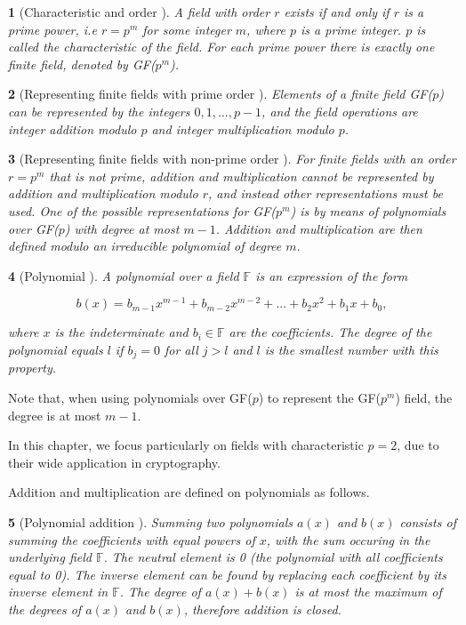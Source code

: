 \documentclass{report}
\newtheorem*{concept}{}{\bfseries}{\itshape}
\begin{document}
\begin{concept}[Characteristic and order \cite{DesignOfRijndael2002}]
A field with order $r$ exists if and only if $r$ is a prime power, i.e $r = p^m$ for some integer $m$, where $p$ is a prime integer. $p$ is called the \emph{characteristic} of the field. For each prime power there is exactly one finite field, denoted by GF($p^m$).
\end{concept}

\begin{concept}[Representing finite fields with prime order \cite{DesignOfRijndael2002}]
Elements of a finite field GF($p$) can be represented by the integers $0, 1, ..., p - 1$, and the field operations are integer addition modulo $p$ and integer multiplication modulo $p$.
\end{concept}

\begin{concept}[Representing finite fields with non-prime order \cite{DesignOfRijndael2002}]
For finite fields with an order $r = p^m$ that is not prime, addition and multiplication cannot be represented by addition and multiplication modulo $r$, and instead other representations must be used. One of the possible representations for GF($p^m$) is by means of \emph{polynomials over GF($p$) with degree at most $m-1$}. Addition and multiplication are then defined modulo an \emph{irreducible polynomial of degree $m$}.
\end{concept}

\begin{concept}[Polynomial \cite{DesignOfRijndael2002}]
A polynomial over a field $\mathbb{F}$ is an expression of the form

$$
b(x) = b_{m-1}x^{m-1} + b_{m-2}x^{m-2} + ... + b_2x^2 + b_1x + b_0,
$$

where $x$ is the \emph{indeterminate} and $b_i \in \mathbb{F}$ are the coefficients. The \emph{degree} of the polynomial equals $l$ if $b_j = 0$ for all $j > l$ and $l$ is the smallest number with this property.
\end{concept}

Note that, when using polynomials over GF($p$) to represent the GF($p^m$) field, the degree is at most $m-1$.

In this chapter, we focus particularly on fields with characteristic $p = 2$, due to their wide application in cryptography.

Addition and multiplication are defined on polynomials as follows.

\begin{concept}[Polynomial addition \cite{DesignOfRijndael2002}]
Summing two polynomials $a(x)$ and $b(x)$ consists of summing the coefficients with equal powers of $x$, with the sum occuring in the underlying field $\mathbb{F}$. The neutral element is 0 (the polynomial with all coefficients equal to 0). The inverse element can be found by replacing each coefficient by its inverse element in $\mathbb{F}$. The degree of $a(x) + b(x)$ is at most the maximum of the degrees of $a(x)$ and $b(x)$, therefore addition is closed.
\end{concept}
\end{document}
